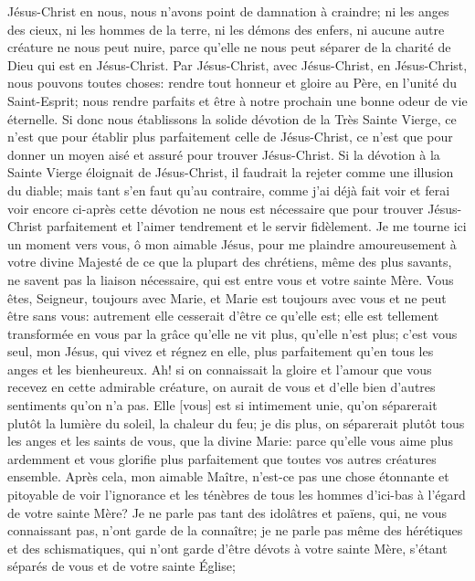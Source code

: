 Jésus-Christ en nous, nous n'avons point de damnation à craindre; ni les anges des cieux, ni les hommes de la
terre, ni les démons des enfers, ni aucune autre créature ne nous peut nuire, parce qu'elle ne nous peut séparer
de la charité de Dieu qui est en Jésus-Christ. Par Jésus-Christ, avec Jésus-Christ, en Jésus-Christ, nous pouvons
toutes choses: rendre tout honneur et gloire au Père, en l'unité du Saint-Esprit; nous rendre parfaits et être à notre
prochain une bonne odeur de vie éternelle.
 Si donc nous établissons la solide dévotion de la Très Sainte Vierge, ce n'est que pour établir plus
parfaitement celle de Jésus-Christ, ce n'est que pour donner un moyen aisé et assuré pour trouver Jésus-Christ. Si
la dévotion à la Sainte Vierge éloignait de Jésus-Christ, il faudrait la rejeter comme une illusion du diable; mais tant
s'en faut qu'au contraire, comme j'ai déjà fait voir et ferai voir encore ci-après cette dévotion ne nous est
nécessaire que pour trouver Jésus-Christ parfaitement et l'aimer tendrement et le servir fidèlement.
 Je me tourne ici un moment vers vous, ô mon aimable Jésus, pour me plaindre amoureusement à votre divine
Majesté de ce que la plupart des chrétiens, même des plus savants, ne savent pas la liaison nécessaire, qui est
entre vous et votre sainte Mère. Vous êtes, Seigneur, toujours avec Marie, et Marie est toujours avec vous et ne
peut être sans vous: autrement elle cesserait d'être ce qu'elle est; elle est tellement transformée en vous par la
grâce qu'elle ne vit plus, qu'elle n'est plus; c'est vous seul, mon Jésus, qui vivez et régnez en elle, plus
parfaitement qu'en tous les anges et les bienheureux. Ah! si on connaissait la gloire et l'amour que vous recevez
en cette admirable créature, on aurait de vous et d'elle bien d'autres sentiments qu'on n'a pas. Elle [vous] est si
intimement unie, qu'on séparerait plutôt la lumière du soleil, la chaleur du feu; je dis plus, on séparerait plutôt tous
les anges et les saints de vous, que la divine Marie: parce qu'elle vous aime plus ardemment et vous glorifie plus
parfaitement que toutes vos autres créatures ensemble.
 Après cela, mon aimable Maître, n'est-ce pas une chose étonnante et pitoyable de voir l'ignorance et les
ténèbres de tous les hommes d'ici-bas à l'égard de votre sainte Mère? Je ne parle pas tant des idolâtres et païens,
qui, ne vous connaissant pas, n'ont garde de la connaître; je ne parle pas même des hérétiques et des
schismatiques, qui n'ont garde d'être dévots à votre sainte Mère, s'étant séparés de vous et de votre sainte Église;
